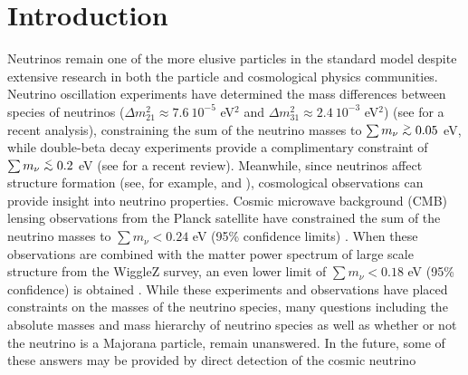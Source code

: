 \documentclass{aastex}
\def\ltsima{$\; \buildrel < \over \sim \;$}
\def\lsim{\lower.5ex\hbox{\ltsima}}
\def\gtsima{$\; \buildrel > \over \sim \;$}
\def\gsim{\lower.5ex\hbox{\gtsima}}
\begin{document}



\section{Introduction}
\label{sec:Introduction}

Neutrinos remain one of the more elusive particles in the
standard model despite extensive research in both the particle and
cosmological physics communities.  Neutrino oscillation experiments
have determined the mass differences between species of
neutrinos ($\Delta m_{21}^2 \approx 7.6~10^{-5} $ eV$^2$ and
$\Delta m_{31}^2 \approx 2.4~10^{-3}$ eV$^2$) (see \cite{schwetz11} for
a recent analysis), constraining the sum of the neutrino
masses to $\sum m_\nu \gsim 0.05$ eV, while double-beta decay experiments
provide a complimentary constraint of  $\sum m_\nu \lsim 0.2$ eV (see
\cite{guzowski15} for a recent review). Meanwhile, since neutrinos affect
structure formation (see, for example, \cite{lesgourgues06} and
\cite{wong11}), cosmological observations can provide
 insight into neutrino properties.  
Cosmic microwave background (CMB) lensing observations from the Planck
satellite have constrained the sum of the neutrino masses to $\sum
m_\nu < 0.24$ eV (95\% confidence limits) \citep{planck15nu}.  When these observations are
combined with the matter power spectrum of large scale structure from
the WiggleZ survey, an even lower limit of $\sum m_\nu < 0.18$ eV (95\%
confidence) is obtained \citep{wigglez}. 
While these experiments and observations have placed constraints on
the 
masses of the neutrino species, many questions including the absolute masses and mass hierarchy of
neutrino species as well as whether or not the neutrino is a Majorana
particle,  remain unanswered.  In the future, some of these answers
may be provided by direct detection of the cosmic neutrino
\end{document}
